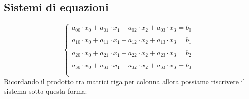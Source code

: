 \documentclass[10pt,a4paper]{article}
\begin{document}
%
%
%

\subsection{Sistemi di equazioni}
\[ \left\{
\begin{array}{rl}
a_{00}\cdot x_0+a_{01}\cdot x_1+a_{02}\cdot x_2+a_{03}\cdot x_3=b_0\\\\
a_{10}\cdot x_0+a_{11}\cdot x_1+a_{12}\cdot x_2+a_{13}\cdot x_3=b_1\\\\
a_{20}\cdot x_0+a_{21}\cdot x_1+a_{22}\cdot x_2+a_{23}\cdot x_3=b_2\\\\
a_{30}\cdot x_0+a_{31}\cdot x_1+a_{32}\cdot x_2+a_{33}\cdot x_3=b_3\\\\
\end{array}
\right.   \]
Ricordando il prodotto tra matrici riga per colonna allora possiamo riscrivere il sistema sotto questa forma:
\end{document}
